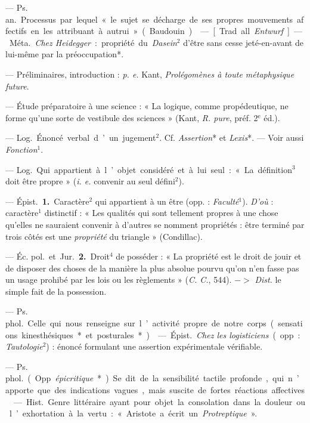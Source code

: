 \begin{itemize}[leftmargin=1cm, label=, itemsep=1pt]
 — \si{Ps. an.} Processus par lequel « le sujet se décharge
de ses propres mouvements affectifs en les attribuant à autrui » (Baudouin).

 — [Trad. all. {\it Entwurf}] — \si{Méta.} {\it Chez
Heidegger} : propriété du {\it Dasein}$^2$ d’être sans cesse jeté-en-avant
de lui-même par la préoccupation*.

 — Préliminaires, introduction : {\it p. e.} Kant, {\it
Prolégomènes à toute métaphysique future}.

 — Étude préparatoire à une science : « La logique, comme
propédeutique, ne forme qu'une sorte de vestibule des sciences » (Kant,
{\it R. pure}, préf. 2$^\text{e}$ éd.).

 — \si{Log.} Énoncé verbal d’un jugement$^2$. Cf.
{\it Assertion}* et {\it Lexis}*. — Voir aussi {\it Fonction}$^1$.

 — \si{Log.} Qui appartient à
l’objet considéré et à lui seul : « La
définition$^3$ doit être propre » ({\it i. e.} convenir au seul défini$^2$).

 — \si{Épist.} {\bf 1.} Caractère$^2$ qui appartient à un être
(opp. : {\it Faculté}$^1$). {\it D'où} : caractère$^1$ distinctif : « Les
qualités qui sont tellement propres à une chose qu'elles ne sauraient
convenir à d’autres se nomment propriétés : être terminé par trois côtés est
une {\it propriété} du triangle » (Condillac).

— \si{Éc. pol.} et \si{Jur.} {\bf 2.} Droit$^4$ de posséder : « La propriété est
le droit de jouir et de disposer des choses de la manière la plus absolue
pourvu qu’on n’en fasse pas un usage prohibé par les lois ou les règlements
» ({\it C. C.}, 544). $->$ {\it Dist.} le simple fait de la possession.

 — \si{Ps. phol.} Celle qui nous renseigne
sur l’activité propre de notre corps (sensations kinesthésiques* et
posturales*).

 — \si{Épist.} {\it Chez les logisticiens} (opp. : {\it
Tautologie}$^2$) : énoncé formulant une assertion expérimentale vérifiable.

 — \si{Ps. phol.} (Opp. {\it épicritique}*). Se dit de la
sensibilité tactile profonde, qui n’apporte que des indications vagues, mais
suscite de fortes réactions affectives.

 — \si{Hist.} Genre littéraire ayant pour objet la
consolation dans la douleur ou l’exhortation à la vertu : « Aristote a écrit
un {\it Protreptique} ».


\end{itemize}
